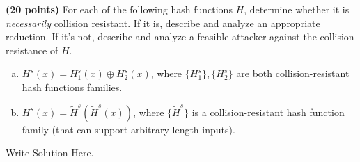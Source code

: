 \documentclass[12pt]{hw}
\begin{document}
\begin{exercise} \textbf{(20 points)}
  For each of the following hash functions $H$, determine whether it
  is \emph{necessarily} collision resistant. If it is, describe and
  analyze an appropriate reduction. If it's not, describe and analyze
  a feasible attacker against the collision resistance of $H$.
  
  \begin{enumerate}[(a)]
  \item $H^{s}(x) = H_1^{s}(x) \oplus H_2^{s}(x)$, where $\{H^s_1\}, \{H^s_2\}$ are both
    collision-resistant hash functions families.
  
  \item $H^s(x) = \widetilde{H}^s(\widetilde{H}^s(x))$, where $\{\widetilde{H}^s\}$ is a collision-resistant hash
    function family (that can support arbitrary length inputs).
  \end{enumerate}

\end{exercise}
\begin{answer}
Write Solution Here.
\end{answer}
\end{document}
